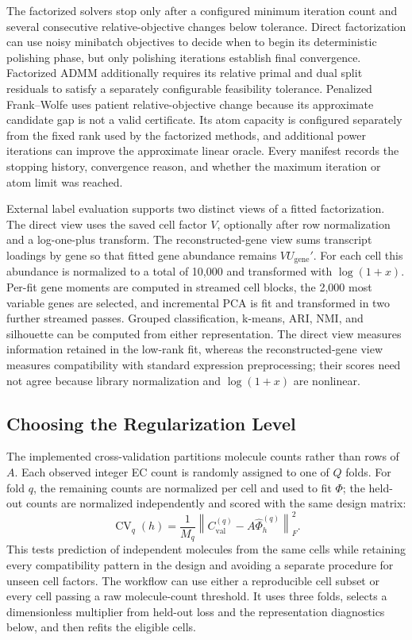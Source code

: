 \documentclass[11pt]{article}
\begin{document}
The factorized solvers stop only after a configured minimum iteration count
and several consecutive relative-objective changes below tolerance. Direct
factorization can use noisy minibatch objectives to decide when to begin its
deterministic polishing phase, but only polishing iterations establish final
convergence.
Factorized ADMM additionally requires its relative primal and dual split
residuals to satisfy a separately configurable feasibility tolerance.
Penalized Frank--Wolfe uses patient
relative-objective change because its approximate candidate gap is not a
valid certificate.
Its atom capacity is configured separately from the fixed rank used by the
factorized methods, and additional power iterations can improve the approximate
linear oracle. Every manifest records the stopping history, convergence reason,
and whether the maximum iteration or atom limit was reached.

External label evaluation supports two distinct views of a fitted
factorization. The direct view uses the saved cell factor \(V\), optionally
after row normalization and a log-one-plus transform. The reconstructed-gene
view sums transcript loadings by gene so that fitted gene abundance remains
\(VU_{\mathrm{gene}}'\). For each cell this abundance is normalized to a total
of 10,000 and transformed with \(\log(1+x)\). Per-fit gene moments are computed
in streamed cell blocks, the 2,000 most variable genes are selected, and
incremental PCA is fit and transformed in two further streamed passes.
Grouped classification, k-means, ARI, NMI, and silhouette can be computed
from either representation. The direct view measures information retained in
the low-rank fit, whereas the reconstructed-gene view measures compatibility
with standard expression preprocessing; their scores need not agree because
library normalization and \(\log(1+x)\) are nonlinear.

\subsection*{Choosing the Regularization Level}

The implemented cross-validation partitions molecule counts rather than rows
of \(A\). Each observed integer EC count is randomly assigned to one of \(Q\)
folds. For fold \(q\), the remaining counts are normalized per cell and used to
fit \(\Phi\); the held-out counts are normalized independently and scored with
the same design matrix:
\[
  \operatorname{CV}_q(h)
  = \frac{1}{M_q}
    \left\|C_{\mathrm{val}}^{(q)}
    -A\hat\Phi_h^{(q)}\right\|_F^2.
\]
This tests prediction of independent molecules from the same cells while
retaining every compatibility pattern in the design and avoiding a separate
procedure for unseen cell factors. The workflow can use either a reproducible
cell subset or every cell passing a raw molecule-count threshold. It uses three
folds, selects a dimensionless multiplier from held-out loss and the
representation diagnostics below, and then refits the eligible cells.
\end{document}
